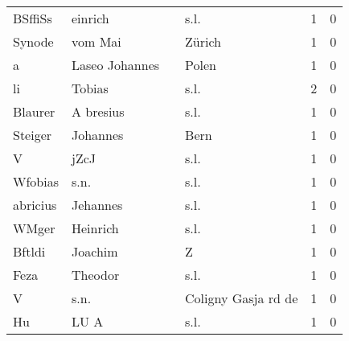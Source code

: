 \begin{center}
\begin{tiny}
\begin{longtabu}{llllrr}
                  BSffiSs &                            einrich &             &                                        s.l. &          1 &         0 \\
                   Synode &                            vom Mai &             &                                      Zürich &          1 &         0 \\
                        a &                     Laseo Johannes &             &                                       Polen &          1 &         0 \\
                       li &                             Tobias &             &                                        s.l. &          2 &         0 \\
                  Blaurer &                          A bresius &             &                                        s.l. &          1 &         0 \\
                  Steiger &                           Johannes &             &                                        Bern &          1 &         0 \\
                        V &                               jZcJ &             &                                        s.l. &          1 &         0 \\
                  Wfobias &                               s.n. &             &                                        s.l. &          1 &         0 \\
                 abricius &                           Jehannes &             &                                        s.l. &          1 &         0 \\
                    WMger &                           Heinrich &             &                                        s.l. &          1 &         0 \\
                   Bftldi &                            Joachim &             &                                           Z &          1 &         0 \\
                     Feza &                            Theodor &             &                                        s.l. &          1 &         0 \\
                        V &                               s.n. &             &                         Coligny Gasja rd de &          1 &         0 \\
                       Hu &                               LU A &             &                                        s.l. &          1 &         0 \\

\end{longtabu}
\end{tiny}
\end{center}
